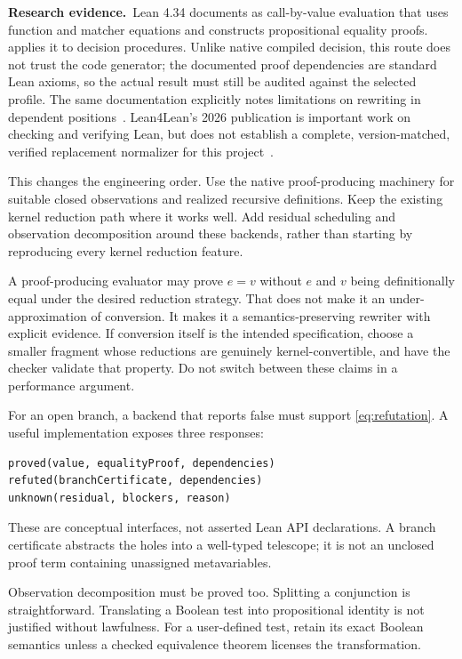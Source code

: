 \documentclass[11pt,a4paper]{article}
\theoremstyle{definition}
\theoremstyle{remark}
\newcommand{\code}[1]{\texttt{\detokenize{#1}}}
\newcommand{\lit}{\par\noindent\textbf{Research evidence.}\ }
\begin{document}
\lit Lean 4.34 documents \code{cbv} as call-by-value evaluation that uses
function and matcher equations and constructs propositional equality proofs.
\code{decide_cbv} applies it to decision procedures. Unlike native compiled
decision, this route does not trust the code generator; the documented proof
dependencies are standard Lean axioms, so the actual result must still be
audited against the selected profile. The same documentation explicitly
notes limitations on rewriting in dependent positions~\cite{lean-cbv}.
Lean4Lean's 2026 publication is important work on checking and verifying Lean,
but does not establish a complete, version-matched, verified replacement
normalizer for this project~\cite{lean4lean}.

This changes the engineering order. Use the native proof-producing machinery
for suitable closed observations and realized recursive definitions. Keep the
existing kernel reduction path where it works well. Add residual scheduling
and observation decomposition around these backends, rather than starting by
reproducing every kernel reduction feature.

A proof-producing evaluator may prove $e=v$ without $e$ and $v$ being
definitionally equal under the desired reduction strategy. That does not make
it an under-approximation of conversion. It makes it a semantics-preserving
rewriter with explicit evidence. If conversion itself is the intended
specification, choose a smaller fragment whose reductions are genuinely
kernel-convertible, and have the checker validate that property. Do not switch
between these claims in a performance argument.

For an open branch, a backend that reports false must support
\eqref{eq:refutation}. A useful implementation exposes three responses:
\begin{lstlisting}
proved(value, equalityProof, dependencies)
refuted(branchCertificate, dependencies)
unknown(residual, blockers, reason)
\end{lstlisting}
These are conceptual interfaces, not asserted Lean API declarations. A branch
certificate abstracts the holes into a well-typed telescope; it is not an
unclosed proof term containing unassigned metavariables.

Observation decomposition must be proved too. Splitting a conjunction is
straightforward. Translating a Boolean \code{BEq} test into propositional
identity is not justified without lawfulness. For a user-defined test,
retain its exact Boolean semantics unless a checked equivalence theorem
licenses the transformation.
\end{document}
